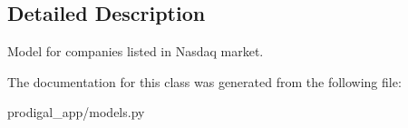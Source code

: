 \subsection{Detailed Description}
\begin{DoxyVerb}Model for companies listed in Nasdaq market.
\end{DoxyVerb}
 

The documentation for this class was generated from the following file\+:\begin{DoxyCompactItemize}
\item 
prodigal\+\_\+app/models.\+py\end{DoxyCompactItemize}
